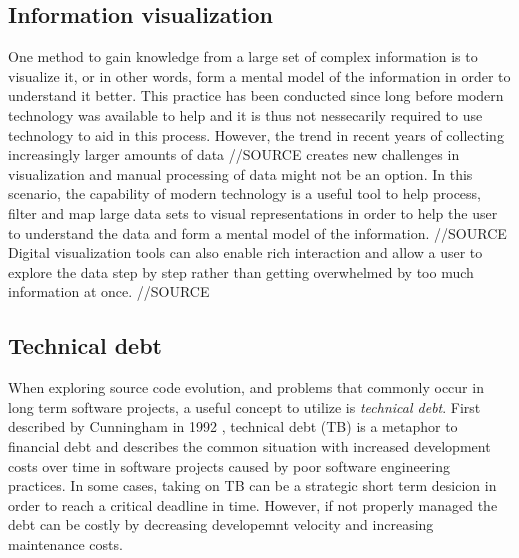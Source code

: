 \subsection{Information visualization}
One method to gain knowledge from a large set of complex information is to visualize it, or in other words, form a mental model of the information in order to understand it better. \cite{spence_information_2014}
This practice has been conducted since long before modern technology was available to help and it is thus not nessecarily required to use technology to aid in this process. \cite{friendly_brief_2008}
However, the trend in recent years of collecting increasingly larger amounts of data //SOURCE creates new challenges in visualization and manual processing of data might not be an option. 
In this scenario, the capability of modern technology is a useful tool to help process, filter and map large data sets to visual representations in order to help the user to understand the data and form a mental model of the information. //SOURCE
Digital visualization tools can also enable rich interaction and allow a user to explore the data step by step rather than getting overwhelmed by too much information at once. //SOURCE

\subsection{Technical debt}
When exploring source code evolution, and problems that commonly occur in long term software projects, a useful concept to utilize is \textit{technical debt}.
First described by Cunningham in 1992 \cite{cunningham_wycash_1992}, technical debt (TB) is a metaphor to financial debt and describes the common situation with increased development costs over time in software projects caused by poor software engineering practices. \cite{tom_exploration_2013}
In some cases, taking on TB can be a strategic short term desicion in order to reach a critical deadline in time.
However, if not properly managed the debt can be costly by decreasing developemnt velocity and increasing maintenance costs. \cite{seaman_using_2012}

